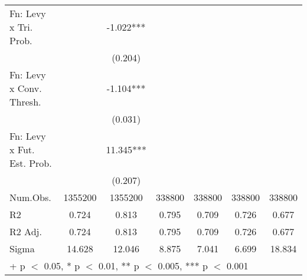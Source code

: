 \begin{table}
\begin{tabular}[t]{lcccccc}
Fn: Levy x Tri. Prob. &  & -1.022*** &  &  &  & \\
 &  & (0.204) &  &  &  & \\
Fn: Levy x Conv. Thresh. &  & -1.104*** &  &  &  & \\
 &  & (0.031) &  &  &  & \\
Fn: Levy x Fut. Est. Prob. &  & 11.345*** &  &  &  & \\
 &  & (0.207) &  &  &  & \\
\midrule
Num.Obs. & 1355200 & 1355200 & 338800 & 338800 & 338800 & 338800\\
R2 & 0.724 & 0.813 & 0.795 & 0.709 & 0.726 & 0.677\\
R2 Adj. & 0.724 & 0.813 & 0.795 & 0.709 & 0.726 & 0.677\\
Sigma & 14.628 & 12.046 & 8.875 & 7.041 & 6.699 & 18.834\\
\bottomrule
\multicolumn{7}{l}{\textsuperscript{} + p $<$ 0.05, * p $<$ 0.01, ** p $<$ 0.005, *** p $<$ 0.001}\\
\end{tabular}
\end{table}
